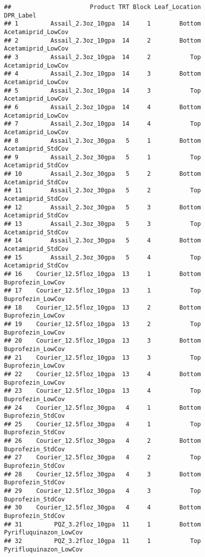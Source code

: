 \documentclass[
]{article}
\begin{document}
\begin{verbatim}
##                      Product TRT Block Leaf_Location              DPR_Label
## 1         Assail_2.3oz_10gpa  14     1        Bottom     Acetamiprid_LowCov
## 2         Assail_2.3oz_10gpa  14     2        Bottom     Acetamiprid_LowCov
## 3         Assail_2.3oz_10gpa  14     2           Top     Acetamiprid_LowCov
## 4         Assail_2.3oz_10gpa  14     3        Bottom     Acetamiprid_LowCov
## 5         Assail_2.3oz_10gpa  14     3           Top     Acetamiprid_LowCov
## 6         Assail_2.3oz_10gpa  14     4        Bottom     Acetamiprid_LowCov
## 7         Assail_2.3oz_10gpa  14     4           Top     Acetamiprid_LowCov
## 8         Assail_2.3oz_30gpa   5     1        Bottom     Acetamiprid_StdCov
## 9         Assail_2.3oz_30gpa   5     1           Top     Acetamiprid_StdCov
## 10        Assail_2.3oz_30gpa   5     2        Bottom     Acetamiprid_StdCov
## 11        Assail_2.3oz_30gpa   5     2           Top     Acetamiprid_StdCov
## 12        Assail_2.3oz_30gpa   5     3        Bottom     Acetamiprid_StdCov
## 13        Assail_2.3oz_30gpa   5     3           Top     Acetamiprid_StdCov
## 14        Assail_2.3oz_30gpa   5     4        Bottom     Acetamiprid_StdCov
## 15        Assail_2.3oz_30gpa   5     4           Top     Acetamiprid_StdCov
## 16    Courier_12.5floz_10gpa  13     1        Bottom      Buprofezin_LowCov
## 17    Courier_12.5floz_10gpa  13     1           Top      Buprofezin_LowCov
## 18    Courier_12.5floz_10gpa  13     2        Bottom      Buprofezin_LowCov
## 19    Courier_12.5floz_10gpa  13     2           Top      Buprofezin_LowCov
## 20    Courier_12.5floz_10gpa  13     3        Bottom      Buprofezin_LowCov
## 21    Courier_12.5floz_10gpa  13     3           Top      Buprofezin_LowCov
## 22    Courier_12.5floz_10gpa  13     4        Bottom      Buprofezin_LowCov
## 23    Courier_12.5floz_10gpa  13     4           Top      Buprofezin_LowCov
## 24    Courier_12.5floz_30gpa   4     1        Bottom      Buprofezin_StdCov
## 25    Courier_12.5floz_30gpa   4     1           Top      Buprofezin_StdCov
## 26    Courier_12.5floz_30gpa   4     2        Bottom      Buprofezin_StdCov
## 27    Courier_12.5floz_30gpa   4     2           Top      Buprofezin_StdCov
## 28    Courier_12.5floz_30gpa   4     3        Bottom      Buprofezin_StdCov
## 29    Courier_12.5floz_30gpa   4     3           Top      Buprofezin_StdCov
## 30    Courier_12.5floz_30gpa   4     4        Bottom      Buprofezin_StdCov
## 31         PQZ_3.2floz_10gpa  11     1        Bottom Pyrifluquinazon_LowCov
## 32         PQZ_3.2floz_10gpa  11     1           Top Pyrifluquinazon_LowCov

\end{verbatim}
\end{document}
